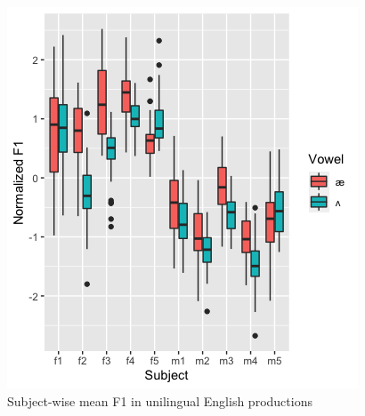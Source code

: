 \documentclass[12 pt]{article}
\begin{document}
\begin{figure}[h] %
	
	\includegraphics[scale=1]{vowel_by_subject_ggplot}
	\caption{Subject-wise mean F1 in unilingual English productions}
	\label{boxplot_F1}
\end{figure}
\end{document}
